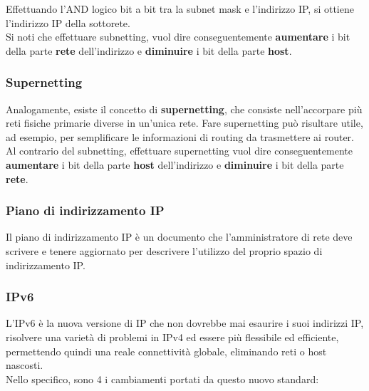             Effettuando l'AND logico bit a bit tra la subnet mask e l'indirizzo IP, si ottiene l'indirizzo IP della
            sottorete.\\
            
            Si noti che effettuare subnetting, vuol dire conseguentemente \textbf{aumentare} i bit della parte \textbf{rete}
            dell’indirizzo e \textbf{diminuire} i bit della parte \textbf{host}.


        \subsubsection{Supernetting}
            Analogamente, esiste il concetto di \textbf{supernetting}, che consiste nell’accorpare più reti fisiche
            primarie diverse in un’unica rete. Fare supernetting può risultare utile, ad esempio, per
            semplificare le informazioni di routing da trasmettere ai router.\\

            Al contrario del subnetting, effettuare supernetting vuol dire conseguentemente \textbf{aumentare} i
            bit della parte \textbf{host} dell’indirizzo e \textbf{diminuire} i bit della parte \textbf{rete}.
            
        \subsubsection{Piano di indirizzamento IP}
            Il piano di indirizzamento IP è un documento che l’amministratore di rete deve scrivere e tenere
            aggiornato per descrivere l’utilizzo del proprio spazio di indirizzamento IP.
            
        \subsubsection{IPv6}
            L’IPv6 è la nuova versione di IP che non dovrebbe mai esaurire i suoi indirizzi IP, risolvere una
            varietà di problemi in IPv4 ed essere più flessibile ed efficiente, permettendo quindi una reale
            connettività globale, eliminando reti o host nascosti.\\
            
            Nello specifico, sono 4 i cambiamenti portati da questo nuovo standard:

